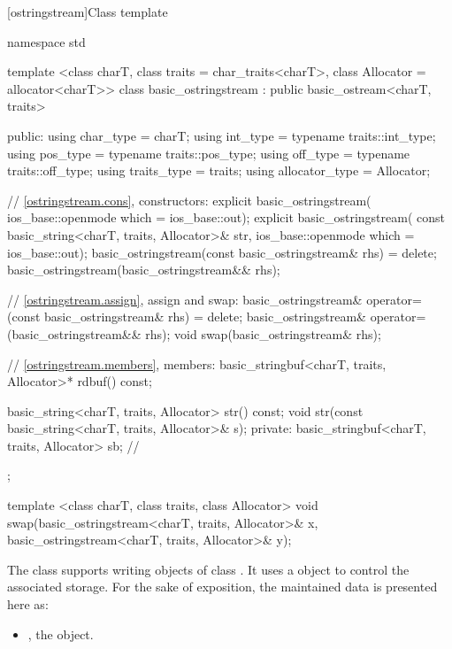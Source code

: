 [ostringstream]{Class template }

%
\begin{codeblock}
namespace std {
  template <class charT, class traits = char_traits<charT>,
            class Allocator = allocator<charT>>
  class basic_ostringstream
    : public basic_ostream<charT, traits> {
  public:
    using char_type      = charT;
    using int_type       = typename traits::int_type;
    using pos_type       = typename traits::pos_type;
    using off_type       = typename traits::off_type;
    using traits_type    = traits;
    using allocator_type = Allocator;

    // \ref{ostringstream.cons}, constructors:
    explicit basic_ostringstream(
      ios_base::openmode which = ios_base::out);
    explicit basic_ostringstream(
      const basic_string<charT, traits, Allocator>& str,
      ios_base::openmode which = ios_base::out);
    basic_ostringstream(const basic_ostringstream& rhs) = delete;
    basic_ostringstream(basic_ostringstream&& rhs);

    // \ref{ostringstream.assign}, assign and swap:
    basic_ostringstream& operator=(const basic_ostringstream& rhs) = delete;
    basic_ostringstream& operator=(basic_ostringstream&& rhs);
    void swap(basic_ostringstream& rhs);

    // \ref{ostringstream.members}, members:
    basic_stringbuf<charT, traits, Allocator>* rdbuf() const;

    basic_string<charT, traits, Allocator> str() const;
    void str(const basic_string<charT, traits, Allocator>& s);
   private:
    basic_stringbuf<charT, traits, Allocator> sb; // \expos
  };

  template <class charT, class traits, class Allocator>
    void swap(basic_ostringstream<charT, traits, Allocator>& x,
              basic_ostringstream<charT, traits, Allocator>& y);
}
\end{codeblock}

\pnum
The class
supports writing objects of class
.
It uses a
object to control the associated storage.
For the sake of exposition, the maintained data is presented here as:
\begin{itemize}
\item
{}, the  object.
\end{itemize}

